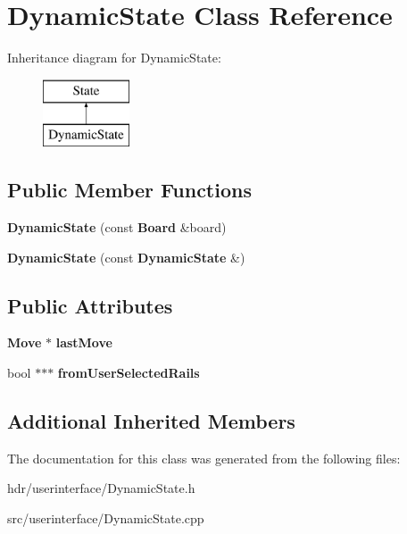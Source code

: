 \section{Dynamic\-State Class Reference}
\label{class_dynamic_state}
Inheritance diagram for Dynamic\-State\-:\begin{figure}[H]
\begin{center}
\leavevmode
\includegraphics[height=2.000000cm]{class_dynamic_state}
\end{center}
\end{figure}
\subsection*{Public Member Functions}
\begin{DoxyCompactItemize}
\item 
{\bfseries Dynamic\-State} (const {\bf Board} \&board)\label{class_dynamic_state_a888844762663eb09cfde480c669213b4}

\item 
{\bfseries Dynamic\-State} (const {\bf Dynamic\-State} \&)\label{class_dynamic_state_a941655a6f314688d8da1dcb6167c5495}

\end{DoxyCompactItemize}
\subsection*{Public Attributes}
\begin{DoxyCompactItemize}
\item 
{\bf Move} $\ast$ {\bfseries last\-Move}\label{class_dynamic_state_ada602a437f88f5761899b730c7ebad23}

\item 
bool $\ast$$\ast$$\ast$ {\bfseries from\-User\-Selected\-Rails}\label{class_dynamic_state_afcb9717d122517126acc39b845a209d9}

\end{DoxyCompactItemize}
\subsection*{Additional Inherited Members}


The documentation for this class was generated from the following files\-:\begin{DoxyCompactItemize}
\item 
hdr/userinterface/Dynamic\-State.\-h\item 
src/userinterface/Dynamic\-State.\-cpp\end{DoxyCompactItemize}
